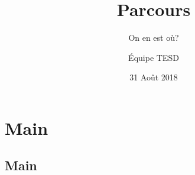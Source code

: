 \documentclass[french]{beamer}
\title[Parcours, Août 2018]{Parcours} %
\subtitle{On en est où?}
\author{Équipe TESD} %
\institute[CRIM] %
{
CRIM \\ %
\medskip
\textit{prenom.nom@crim.ca} %
}
\date{31 Août 2018} %
\begin{document}
\begin{frame}[label=firstframe]
\titlepage %
\end{frame}



\section{Main} %

\subsection{Main} %
\end{document}
